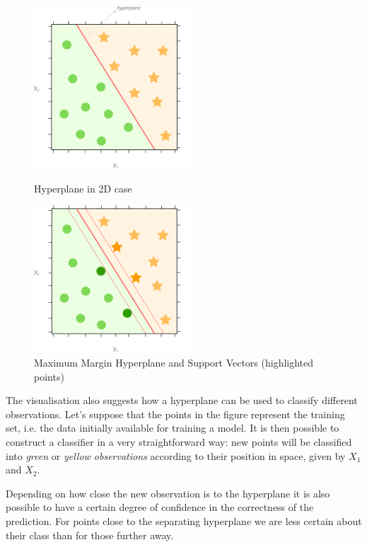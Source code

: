 \documentclass[letterpaper,11pt]{article}
\begin{document}
\begin{figure}
  \includegraphics[width=6cm]{hyperplane_example.png}
  \caption{Hyperplane in 2D case}
  \label{figure:hyperplane_2d}

  \vspace{1.15cm}

  \includegraphics[width=6cm]{max_hyperplane.png}
  \caption{Maximum Margin Hyperplane and Support Vectors (highlighted points)}
  \label{figure:max_margin_classifier}
\end{figure}


The visualisation also suggests how a hyperplane can be used to classify different observations. Let's suppose that the points in the figure represent the training set, i.e. the data initially available for training a model. It is then possible to construct a classifier in a very straightforward way: new points will be classified into \textit{green} or \textit{yellow observations} according to their position in space, given by $X_1$ and $X_2$.

Depending on how close the new observation is to the hyperplane it is also possible to have a certain degree of confidence in the correctness of the prediction. For points close to the separating hyperplane we are less certain about their class than for those further away.

\end{document}
